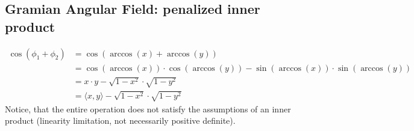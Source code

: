 \documentclass[11pt, a4paper]{article}
\begin{document}
\subsection{Gramian Angular Field: penalized inner product}
\label{app:GAF}
\begin{equation}
    \begin{split}
        \cos(\phi_1 + \phi_2)  & = \cos(\arccos(x) + \arccos(y)) \\
        & = \cos(\arccos(x)) \cdot \cos(\arccos(y)) - \sin(\arccos(x)) \cdot \sin(\arccos(y))\\
        & = x\cdot y - \sqrt{1-x^2} \cdot \sqrt{1-y^2}\\
        & = \langle x, y \rangle - \sqrt{1-x^2} \cdot \sqrt{1-y^2}
    \end{split}
\end{equation}
 Notice, that the entire operation does not satisfy the assumptions of an inner product (linearity limitation, not necessarily positive definite).




\end{document}
